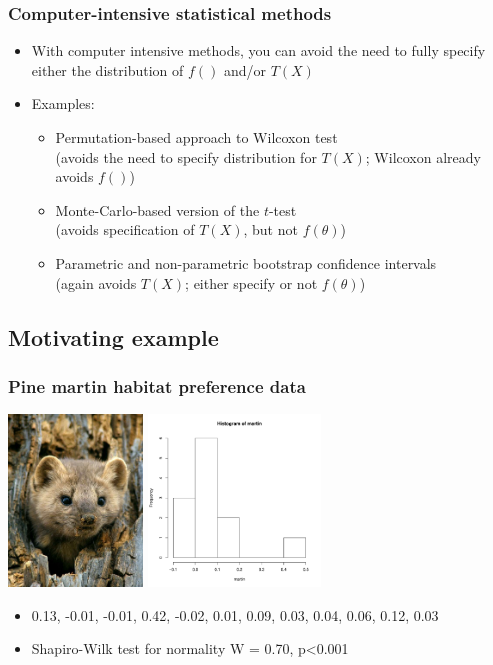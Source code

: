 \documentclass[ignorenonframetext]{beamer} %
\newcommand{\bc}{\begin{center}}
\newcommand{\ec}{\end{center}}
\newcommand{\bi}{\begin{itemize}}
\newcommand{\ei}{\end{itemize}}
\begin{document}
\begin{frame}
	\frametitle{Computer-intensive statistical methods}
	\bi
		\item With computer intensive methods, you can avoid the need to fully specify either the distribution of $f()$ and/or $T(X)$
		\item Examples:
		\bi
			\item Permutation-based approach to Wilcoxon test\\
			(avoids the need to specify distribution for $T(X)$; Wilcoxon already avoids $f()$)
			\item Monte-Carlo-based version of the $t$-test\\
			(avoids specification of $T(X)$, but not $f(\theta)$)
			\item Parametric and non-parametric bootstrap confidence intervals\\
			(again avoids $T(X)$; either specify or not $f(\theta)$)
		\ei
	\ei

\end{frame}

\subsection{Motivating example}

\begin{frame}
	\frametitle{Pine martin habitat preference data}
\bc
\includegraphics[height=1.8in]{pine_martin}
\includegraphics[height=1.8in]{martin_hist}
\ec
	\bi
		\item 0.13, -0.01, -0.01, 0.42, -0.02, 0.01, 0.09, 0.03, 0.04, 0.06, 0.12, 0.03
		\item Shapiro-Wilk test for normality W = 0.70, p<0.001
	\ei
\end{frame}
\end{document}
